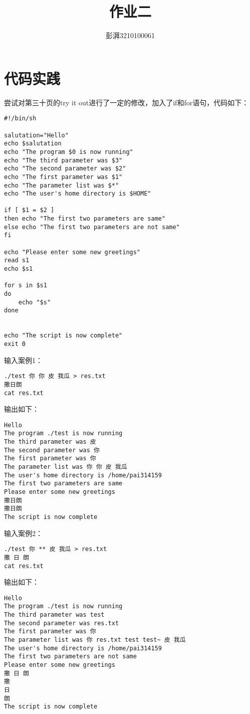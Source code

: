 \documentclass{ctexart}
\title{作业二}
\author{彭湃3210100061}
\begin{document}
\maketitle

\section{代码实践}
尝试对第三十页的try it out进行了一定的修改，加入了if和for语句，代码如下：

\begin{verbatim}
#!/bin/sh

salutation="Hello"
echo $salutation
echo "The program $0 is now running"
echo "The third parameter was $3"
echo "The second parameter was $2"
echo "The first parameter was $1"
echo "The parameter list was $*"
echo "The user's home directory is $HOME"

if [ $1 = $2 ]
then echo "The first two parameters are same"
else echo "The first two parameters are not same"
fi
    
echo "Please enter some new greetings"
read s1
echo $s1

for s in $s1
do
    echo "$s"
done


echo "The script is now complete"
exit 0
\end{verbatim}

输入案例1：
\begin{verbatim}
./test 你 你 皮 我瓜 > res.txt
撒日朗
cat res.txt

\end{verbatim}

输出如下：
\begin{verbatim}
Hello
The program ./test is now running
The third parameter was 皮
The second parameter was 你
The first parameter was 你
The parameter list was 你 你 皮 我瓜
The user's home directory is /home/pai314159
The first two parameters are same
Please enter some new greetings
撒日朗
撒日朗
The script is now complete
\end{verbatim}

输入案例2：
\begin{verbatim}
./test 你 ** 皮 我瓜 > res.txt
撒 日 朗
cat res.txt
\end{verbatim}

输出如下：
\begin{verbatim}
Hello
The program ./test is now running
The third parameter was test
The second parameter was res.txt
The first parameter was 你
The parameter list was 你 res.txt test test~ 皮 我瓜
The user's home directory is /home/pai314159
The first two parameters are not same
Please enter some new greetings
撒 日 朗
撒
日
朗
The script is now complete
\end{verbatim}
\end{document}

